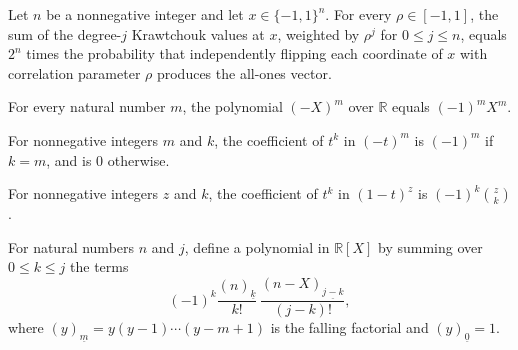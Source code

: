 \begin{theorem}
\label{FABL.sum_krawtchoukValue_mul_pow_eq_noiseKernel}
\leanok
{}
Let $n$ be a nonnegative integer and let $x\in\{-1,1\}^n$. For every $\rho\in[-1,1]$,
the sum of the degree-$j$ Krawtchouk values at $x$, weighted by $\rho^j$ for $0\le j\le
n$, equals $2^n$ times the probability that independently flipping each coordinate of
$x$ with correlation parameter $\rho$ produces the all-ones vector.
\end{theorem}

\begin{theorem}
\label{FABL.neg_X_pow_eq}
\leanok
{}
For every natural number $m$, the polynomial $(-X)^m$ over $\mathbb R$ equals $(-1)^m
X^m$.
\end{theorem}

\begin{theorem}
\label{FABL.coeff_neg_X_pow}
\leanok
{}
For nonnegative integers $m$ and $k$, the coefficient of $t^k$ in $(-t)^m$ is $(-1)^m$
if $k=m$, and is $0$ otherwise.
\end{theorem}

\begin{theorem}
\label{FABL.coeff_one_sub_X_pow}
\leanok
{}
For nonnegative integers $z$ and $k$, the coefficient of $t^k$ in $(1-t)^z$ is
$(-1)^k\binom{z}{k}$.
\end{theorem}

\begin{definition}
\label{FABL.krawtchoukPolynomial}
\leanok
For natural numbers $n$ and $j$, define a polynomial in $\mathbb{R}[X]$ by summing over
$0\le k\le j$ the terms
\[(-1)^k\frac{(n)_{\underline{k}}}{k!}\,\frac{(n-X)_{\underline{j-k}}}{(j-k)!},\]
where $(y)_{\underline{m}}=y(y-1)\cdots(y-m+1)$ is the falling factorial and
$(y)_{\underline{0}}=1$.
\end{definition}

